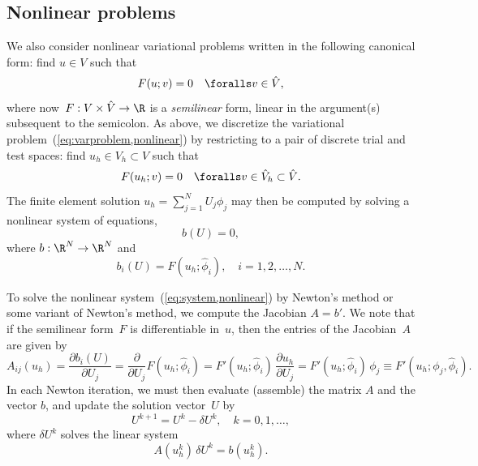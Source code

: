 \subsection{Nonlinear problems}
\label{sec:abstract,nonlinear}

We also consider nonlinear variational problems written in the
following canonical form: find $u \in V$ such that
\begin{equation} \label{eq:varproblem,nonlinear}
  F(u; v) = 0 \quad \foralls v \in \hat{V},
\end{equation}
where now~$F : V \times \hat{V} \rightarrow \R$ is a \emph{semilinear}
form, linear in the argument(s) subsequent to the semicolon. As above,
we discretize the variational problem~(\ref{eq:varproblem,nonlinear})
by restricting to a pair of discrete trial and test spaces: find $u_h
\in V_h \subset V$ such that
\begin{equation}
  F(u_h; v) = 0 \quad \foralls v \in \hat{V}_h \subset \hat{V}.
\end{equation}
The finite element solution $u_h = \sum_{j=1}^N U_j \phi_j$ may then
be computed by solving a nonlinear system of equations,
\begin{equation} \label{eq:system,nonlinear}
  b(U) = 0,
\end{equation}
where $b : \R^N \rightarrow \R^N$ and
\begin{equation}
  b_i(U) = F(u_h; \hat{\phi}_i), \quad i=1,2,\ldots,N.
\end{equation}

%
To solve the nonlinear system~(\ref{eq:system,nonlinear}) by Newton's
method or some variant of Newton's method, we compute the Jacobian $A
= b'$. We note that if the semilinear form~$F$ is differentiable
in~$u$, then the entries of the Jacobian~$A$ are given by
\begin{equation} \label{eq:jacobian}
    A_{ij}(u_h)
    = \frac{\partial b_i(U)}{\partial U_j}
    = \frac{\partial}{\partial U_j} F(u_h; \hat{\phi}_i)
    = F'(u_h; \hat{\phi}_i) \, \frac{\partial u_h}{\partial U_j}
    = F'(u_h; \hat{\phi}_i) \, \phi_j
    \equiv F'(u_h; \phi_j, \hat{\phi}_i).
\end{equation}
In each Newton iteration, we must then evaluate (assemble) the matrix
$A$ and the vector $b$, and update the solution vector~$U$ by
\begin{equation}
  U^{k+1} = U^k - \delta U^k, \quad k = 0,1,\ldots,
\end{equation}
where $\delta U^k$ solves the linear system
\begin{equation} \label{eq:system,linearization}
  A(u_h^k) \, \delta U^k = b(u_h^k).
\end{equation}

